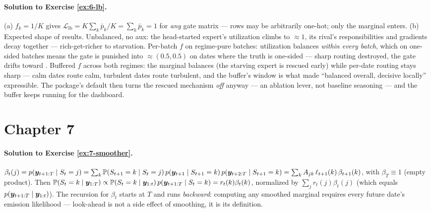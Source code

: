 \paragraph{Solution to Exercise \ref{ex:6-lb}.}
(a) $f_k = 1/K$ gives $\mathcal{L}_{\mathrm{lb}} = K\sum_k \bar p_k/K =
\sum_k \bar p_k = 1$ for \emph{any} gate matrix --- rows may be
arbitrarily one-hot; only the marginal enters. (b) Expected shape of
results. Unbalanced, no aux: the head-started expert's utilization
climbs to $\approx 1$, its rival's responsibilities and gradients decay
together --- rich-get-richer to starvation. Per-batch $f$ on
regime-pure batches: utilization balances \emph{within every batch},
which on one-sided batches means the gate is punished into
$\approx (0.5, 0.5)$ on dates where the truth is one-sided --- sharp
routing destroyed, the gate drifts toward . Buffered $f$
across both regimes: the marginal balances (the starving expert is
rescued early) while per-date routing stays sharp --- calm dates route
calm, turbulent dates route turbulent, and the buffer's window is what
made ``balanced overall, decisive locally'' expressible. The package's
default then turns the rescued mechanism \emph{off} anyway --- an
ablation lever, not baseline seasoning --- and the buffer keeps running
for the dashboard.

\section*{Chapter 7}

\paragraph{Solution to Exercise \ref{ex:7-smoother}.}
$\beta_t(j) = p(\bm{y}_{t+1:T} \mid S_t = j) = \sum_k \mathbb{P}(S_{t+1} = k
\mid S_t = j)\, p(\bm{y}_{t+1} \mid S_{t+1} = k)\, p(\bm{y}_{t+2:T} \mid
S_{t+1} = k) = \sum_k A_{jk}\, \ell_{t+1}(k)\, \beta_{t+1}(k)$, with
$\beta_T \equiv 1$ (empty product). Then $\mathbb{P}(S_t = k \mid \bm{y}_{1:T})
\propto \mathbb{P}(S_t = k \mid \bm{y}_{1:t})\, p(\bm{y}_{t+1:T} \mid S_t = k) =
r_t(k)\beta_t(k)$, normalized by $\sum_j r_t(j)\beta_t(j)$ (which
equals $p(\bm{y}_{t+1:T} \mid \bm{y}_{1:t})$). The recursion for $\beta_t$
starts at $T$ and runs \emph{backward}: computing any smoothed marginal
requires every future date's emission likelihood --- look-ahead is not
a side effect of smoothing, it is its definition.

